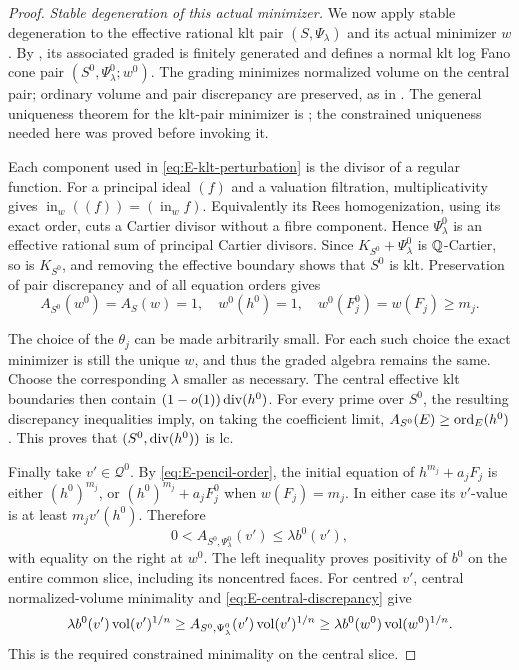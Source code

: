 \begin{proof}
\emph{Stable degeneration of this actual minimizer.}
We now apply stable degeneration to the effective rational klt pair
$(S,\Psi_\lambda)$ and its actual minimizer $w$.
By \cite[Theorems~1.1--1.2]{XuZhuangStable}, its associated graded is
finitely generated and defines a normal klt log Fano cone pair
$(S^0,\Psi_\lambda^0;w^0)$. The grading minimizes normalized volume
on the central pair; ordinary volume and pair discrepancy are
preserved, as in \cite[Lemma~4.10 and Theorem~3.5, arXiv version]{LiXuStable}.
The general uniqueness theorem for the klt-pair minimizer is
\cite[Theorem~1.1]{XuZhuangUnique}; the constrained uniqueness needed
here was proved before invoking it.

Each component used in \eqref{eq:E-klt-perturbation} is the divisor
of a regular function. For a principal ideal $(f)$ and a valuation
filtration, multiplicativity gives
$\operatorname{in}_w((f))=(\operatorname{in}_wf)$.
Equivalently its Rees homogenization, using its exact order, cuts a
Cartier divisor without a fibre component. Hence
$\Psi_\lambda^0$ is an effective rational sum of principal Cartier
divisors. Since $K_{S^0}+\Psi_\lambda^0$ is $\mathbb Q$-Cartier, so is
$K_{S^0}$, and removing the effective boundary shows that $S^0$ is klt.
Preservation of pair discrepancy and of all equation orders gives
\[
 A_{S^0}(w^0)=A_S(w)=1,\quad
 w^0(h^0)=1,\quad w^0(F_j^0)=w(F_j)\ge m_j.
\]

The choice of the $\theta_j$ can be made arbitrarily small. For each
such choice the exact minimizer is still the unique $w$, and thus
the graded algebra remains the same. Choose the corresponding
$\lambda$ smaller as necessary. The central effective klt boundaries
then contain $(1-o(1))\operatorname{div}(h^0)$.
For every prime over $S^0$, the resulting discrepancy inequalities
imply, on taking the coefficient limit,
$A_{S^0}(E)\ge\operatorname{ord}_E(h^0)$. This proves that
$(S^0,\operatorname{div}(h^0))$ is lc.

Finally take $v'\in\mathcal Q^0$. By \eqref{eq:E-pencil-order},
the initial equation of $h^{m_j}+a_jF_j$ is either $(h^0)^{m_j}$,
or $(h^0)^{m_j}+a_jF_j^0$ when $w(F_j)=m_j$.
In either case its $v'$-value is at least $m_jv'(h^0)$.
Therefore
\begin{equation}\label{eq:E-central-discrepancy}
 0<A_{S^0,\Psi_\lambda^0}(v')\le\lambda b^0(v'),
\end{equation}
with equality on the right at $w^0$.
The left inequality proves positivity of $b^0$ on the entire common
slice, including its noncentred faces. For centred $v'$, central
normalized-volume minimality and \eqref{eq:E-central-discrepancy}
give
\[
 \lambda b^0(v')\operatorname{vol}(v')^{1/n}
 \ge A_{S^0,\Psi_\lambda^0}(v')\operatorname{vol}(v')^{1/n}
 \ge\lambda b^0(w^0)\operatorname{vol}(w^0)^{1/n}.
\]
This is the required constrained minimality on the central slice.
\end{proof}

